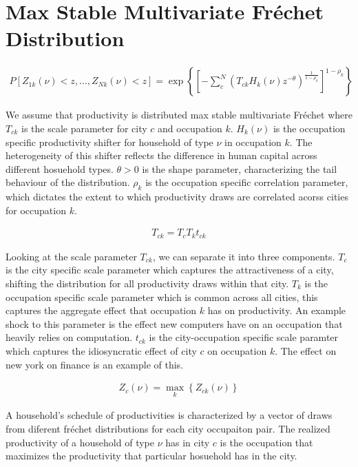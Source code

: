 \documentclass[10pt]{article}
\begin{document}
\section{Max Stable Multivariate Fr\'{e}chet Distribution}

\begin{align}
    P[Z_{1k}(\nu) < z, \dots, Z_{Nk}(\nu) < z] = \exp \left\{ \left[ - \sum_{c}^{N} (T_{ck} H_k(\nu) z^{- \theta})^{\frac{1}{1 - \rho_k}} \right]^{1 - \rho_k} \right\}
\end{align}

We assume that productivity is distributed max stable multivariate Fr\'{e}chet where $T_{ck}$ is the scale parameter for city $c$ and occupation $k$. $H_k(\nu)$ is the occupation specific productivity shifter for household of type $\nu$ in occupation $k$. The heterogeneity of this shifter reflects the difference in human capital across different hosuehold types. $\theta > 0$ is the shape parameter, characterizing the tail behaviour of the distribution. $\rho_k$ is the occupation specific correlation parameter, which dictates the extent to which productivity draws are correlated acorss cities for occupation $k$.

\begin{align}
    T_{ck} = T_c T_k t_{ck}
\end{align}

Looking at the scale parameter $T_{ck}$, we can separate it into three components. $T_c$ is the city specific scale parameter which captures the attractiveness of a city, shifting the distribution for all productivity draws within that city. $T_k$ is the occupation specific scale parameter which is common across all cities, this captures the aggregate effect that occupation $k$ has on productivity. An example shock to this parameter is the effect new computers have on an occupation that heavily relies on computation. $t_{ck}$ is the city-occupation specific scale paramter which captures the idiosyncratic effect of city $c$ on occupation $k$. The effect on new york on finance is an example of this.

\begin{align}
    Z_c(\nu) = \max_k \left\{ Z_{ck} (\nu) \right\}
\end{align}

A household's schedule of productivities is characterized by a vector of draws from diferent fr\'{e}chet distributions for each city occupaiton pair. The realized productivity of a household of type $\nu$ has in city $c$ is the occupation that maximizes the productivity that particular hosuehold has in the city.
\end{document}
